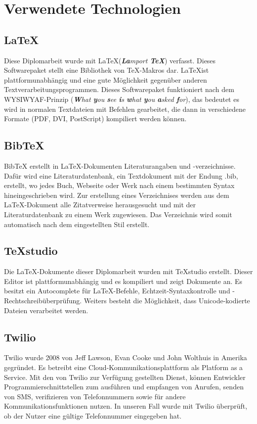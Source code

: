 \chapter{Verwendete Technologien} \label{technologien}

\section{\LaTeX}
Diese Diplomarbeit wurde mit \LaTeX \space (\textit{{\bf{\textit{La}}}mport {\bf{\textit{\TeX}}}}) verfasst. Dieses Softwarepaket stellt eine Bibliothek von \TeX-Makros dar. \LaTeX ist plattformunabhängig und eine gute Möglichkeit gegenüber anderen Textverarbeitungsprogrammen. Dieses Softwarepaket funktioniert nach dem WYSIWYAF-Prinzip (\textit{{\bf{W}}hat {\bf{y}}ou {\bf{s}}ee {\bf{i}}s {\bf{w}}hat {\bf{y}}ou {\bf{a}}sked {\bf{f}}or}), das bedeutet es wird in normalen Textdateien mit Befehlen gearbeitet, die dann in verschiedene Formate (PDF, DVI, PostScript) kompiliert werden können. \autocite{wikiLatex}

\section{BibTeX}
BibTeX erstellt in \LaTeX-Dokumenten Literaturangaben und -verzeichnisse. Dafür wird eine Literaturdatenbank, ein Textdokument mit der Endung .bib, erstellt, wo jedes Buch, Webseite oder Werk nach einem bestimmten Syntax hineingeschrieben wird. Zur erstellung eines Verzeichnises werden aus dem \LaTeX-Dokument alle Zitatverweise herausgesucht und mit der Literaturdatenbank zu einem Werk zugewiesen. Das Verzeichnis wird somit automatisch nach dem eingestellten Stil erstellt. \autocite{wikiBibtex}

\section{TeXstudio}
Die \LaTeX-Dokumente dieser Diplomarbeit wurden mit TeXstudio erstellt. Dieser Editor ist plattformunabhängig und es kompiliert und zeigt Dokumente an. Es besitzt ein Autocomplete für \LaTeX-Befehle, Echtzeit-Syntaxkontrolle und -Rechtschreibüberprüfung. Weiters besteht die Möglichkeit, dass Unicode-kodierte Dateien verarbeitet werden. \autocite{wikiTexstudio}


\section{Twilio} \label{sec:twilio}
Twilio wurde 2008 von Jeff Lawson, Evan Cooke und John Wolthuis in Amerika gegründet. Es betreibt eine Cloud-Kommunikationsplattform als Platform as a Service. Mit den von Twilio zur Verfügung gestellten Dienst, können Entwickler Programmierschnittstellen zum ausführen und empfangen von Anrufen, senden von SMS, verifizieren von Telefonnummern sowie für andere Kommunikationsfunktionen nutzen. In unseren Fall wurde mit Twilio überprüft, ob der Nutzer eine gültige Telefonnummer eingegeben hat. \cite{twilioWebsite}

